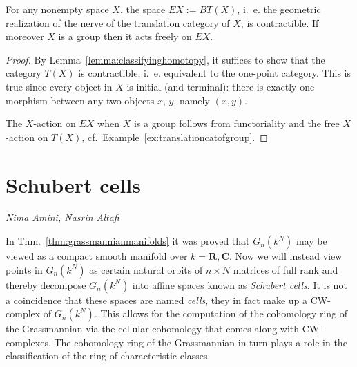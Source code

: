 \documentclass[a4paper,openany]{scrbook}
\newcommand{\chapterauthor}[1]{\hfill\emph{#1}\par\noindent}
\begin{document}
\begin{corollary}\label{cor:EG}
For any nonempty space $X$, the space $EX := BT(X)$, i.~e. the geometric realization of the nerve of the translation category of $X$, is contractible. If moreover $X$ is a group then it acts freely on $EX$.
\end{corollary}
\begin{proof}
By Lemma~\ref{lemma:classifyinghomotopy}, it suffices to show that the category $T(X)$ is contractible, i.~e. equivalent to the one-point category. This is true since every object in $X$ is initial (and terminal): there is exactly one morphism between any two objects $x$, $y$, namely $(x,y)$.

The $X$-action on $EX$ when $X$ is a group follows from functoriality and the free $X$-action on $T(X)$, cf.~Example~\ref{ex:translationcatofgroup}.
\end{proof}

\section{Schubert cells}
\chapterauthor{Nima Amini, Nasrin Altafi}

In Thm.~\ref{thm:grassmannianmanifolds} it was proved that $G_n(k^N)$ may be viewed as a compact smooth manifold over $k = \mathbf{R}, \mathbf{C}$. 
Now we will instead view points in $G_n(k^N)$ as certain natural orbits of $n \times N$ matrices of full rank and thereby decompose $G_n(k^N)$ into affine spaces known as \textit{Schubert cells}. 
It is not a coincidence that these spaces are named \textit{cells}, they in fact make up a CW-complex of $G_n(k^N)$. 
This allows for the computation of the cohomology ring of the Grassmannian via the cellular cohomology that comes along with CW-complexes. 
The cohomology ring of the Grassmannian in turn plays a role in the classification of the ring of characteristic classes. 
\end{document}
